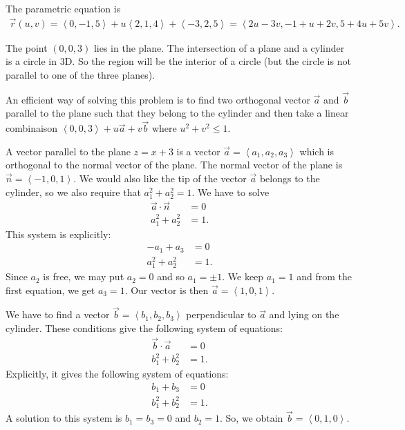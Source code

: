 	\spc
	
	The parametric equation is 
		\begin{align*}
		\vec{r} (u, v) = \left\langle 0, -1, 5 \right\rangle + u \left\langle 2, 1, 4 \right\rangle + \left\langle -3, 2, 5 \right\rangle = \left\langle 2u - 3v , -1 + u + 2v , 5 + 4u + 5v \right\rangle .
		\end{align*}
		
	\spc
		
	The point $(0, 0, 3)$ lies in the plane. The intersection of a plane and a cylinder is a circle in 3D. So the region will be the interior of a circle (but the circle is not parallel to one of the three planes).
	
	An efficient way of solving this problem is to find two orthogonal vector $\vec{a}$ and $\vec{b}$ parallel to the plane such that they belong to the cylinder and then take a linear combinaison $\left\langle 0, 0, 3 \right\rangle + u \vec{a} + v \vec{b}$ where $u^2 + v^2 \leq 1$. 
	
	 A vector parallel to the plane $z = x + 3$ is a vector $\vec{a} =  \left\langle a_1 , a_2 , a_3 \right\rangle$ which is orthogonal to the normal vector of the plane. The normal vector of the plane is $\vec{n} = \left\langle -1, 0, 1 \right\rangle$. We would also like the tip of the vector $\vec{a}$ belongs to the cylinder, so we also require that $a_1^2 + a_2^2 = 1$. We have to solve
	 	\begin{align*}
	 	\vec{a} \cdot \vec{n} &= 0 \\
	 	a_1^2 + a_2^2 &= 1 .
	 	\end{align*}
	This system is explicitly:
		\begin{align*}
		-a_1 + a_3 &= 0 \\
		a_1^2 + a_2^2 &= 1 .
		\end{align*}
	Since $a_2$ is free, we may put $a_2 = 0$ and so $a_1 = \pm 1$. We keep $a_1 = 1$ and from the first equation, we get $a_3 = 1$. Our vector is then $\vec{a} = \left\langle 1 , 0 , 1 \right\rangle$.  
	
	We have to find a vector $\vec{b} = \left\langle b_1 , b_2 , b_3 \right\rangle$ perpendicular to $\vec{a}$ and lying on the cylinder. These conditions give the following system of equations:
		\begin{align*}
		\vec{b} \cdot \vec{a} &= 0 \\
		b_1^2 + b_2^2 &= 1 .
		\end{align*}
	Explicitly, it gives the following system of equations:
		\begin{align*}
		b_1 + b_3 & = 0 \\
		b_1^2 + b_2^2 & = 1 .
		\end{align*}
	A solution to this system is $b_1 = b_3 = 0$ and $b_2 = 1$. So, we obtain $\vec{b} = \left\langle 0, 1, 0 \right\rangle$. 
	
